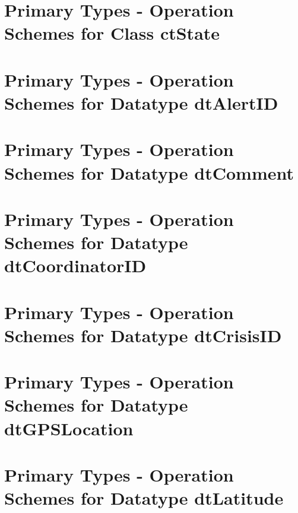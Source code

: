 \section{Primary Types - Operation Schemes for Class ctState} 
\label{OM-CM-PTClass-ctState}






\section{Primary Types - Operation Schemes for Datatype dtAlertID} 
\label{OM-CM-PTDataType-dtAlertID}

\section{Primary Types - Operation Schemes for Datatype dtComment} 
\label{OM-CM-PTDataType-dtComment}

\section{Primary Types - Operation Schemes for Datatype dtCoordinatorID} 
\label{OM-CM-PTDataType-dtCoordinatorID}

\section{Primary Types - Operation Schemes for Datatype dtCrisisID} 
\label{OM-CM-PTDataType-dtCrisisID}

\section{Primary Types - Operation Schemes for Datatype dtGPSLocation} 
\label{OM-CM-PTDataType-dtGPSLocation}


\section{Primary Types - Operation Schemes for Datatype dtLatitude} 
\label{OM-CM-PTDataType-dtLatitude}

